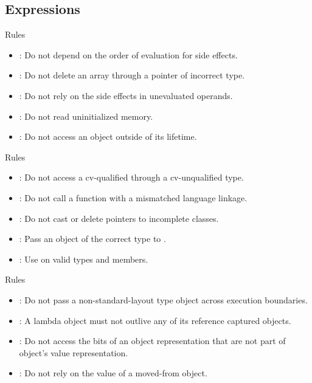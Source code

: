 \subsection{Expressions}

\begin{frame}[t]{Rules}
\begin{itemize}
  \item {}: 
        Do not depend on the order of evaluation for side effects.
  \vfill
  \item {}: 
        Do not delete an array through a pointer of incorrect type.
  \vfill
  \item {}: 
        Do not rely on the side effects in unevaluated operands.
  \vfill
  \item {}:
        Do not read uninitialized memory.
  \vfill
  \item {}:
        Do not access an object outside of its lifetime. 
\end{itemize}
\end{frame}

\begin{frame}[t]{Rules}
\begin{itemize}
  \item {}:
        Do not access a cv-qualified through a cv-unqualified type. 
  \vfill
  \item {}:
        Do not call a function with a mismatched language linkage. 
  \vfill
  \item {}: 
        Do not cast or delete pointers to incomplete classes.
  \vfill
  \item {}:
        Pass an object of the correct type to . 
  \vfill
  \item {}: 
        Use  on valid types and members.
\end{itemize}
\end{frame}

\begin{frame}[t]{Rules}
\begin{itemize}
  \item {}: 
        Do not pass a non-standard-layout type object across execution boundaries. 
  \vfill
  \item {}:
        A lambda object must not outlive any of its reference captured objects. 
  \vfill
  \item {}:
        Do not access the bits of an object representation that are not part
        of object's value representation. 
  \vfill
  \item {}: 
        Do not rely on the value of a moved-from object.
\end{itemize}
\end{frame}


